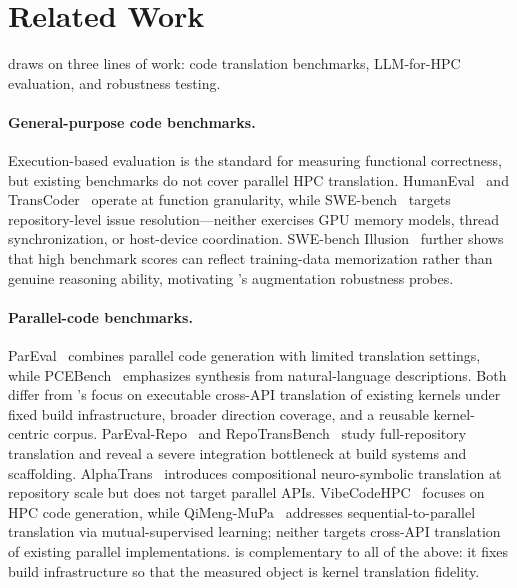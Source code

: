 \section{Related Work}
\label{sec:related-work}
\label{app:related-work} %

\parbench{} draws on three lines of work: code translation benchmarks, LLM-for-HPC evaluation, and robustness testing.

\paragraph{General-purpose code benchmarks.}
Execution-based evaluation is the standard for measuring functional correctness, but existing benchmarks do not cover parallel HPC translation. HumanEval~\cite{HumanEval2021} and TransCoder~\cite{TransCoder2020} operate at function granularity, while SWE-bench~\cite{SWEbench2024} targets repository-level issue resolution—neither exercises GPU memory models, thread synchronization, or host-device coordination. SWE-bench Illusion~\cite{SWEbenchIllusion2025} further shows that high benchmark scores can reflect training-data memorization rather than genuine reasoning ability, motivating \parbench{}'s augmentation robustness probes. 


\paragraph{Parallel-code benchmarks.}
ParEval~\cite{ParEval2024} combines parallel code generation with limited translation settings, while PCEBench~\cite{PCEBench2025} emphasizes synthesis from natural-language descriptions. Both differ from \parbench{}'s focus on executable cross-API translation of existing kernels under fixed build infrastructure, broader direction coverage, and a reusable kernel-centric corpus. ParEval-Repo~\cite{ParEvalRepo2025} and RepoTransBench~\cite{Wang2026RepoTransBench} study full-repository translation and reveal a severe integration bottleneck at build systems and scaffolding. AlphaTrans~\cite{AlphaTrans2025} introduces compositional neuro-symbolic translation at repository scale but does not target parallel APIs. VibeCodeHPC~\cite{VibeCodeHPC2026} focuses on HPC code generation, while QiMeng-MuPa~\cite{QiMengMuPa2025} addresses sequential-to-parallel translation via mutual-supervised learning; neither targets cross-API translation of existing parallel implementations. \parbench{} is complementary to all of the above: it fixes build infrastructure so that the measured object is kernel translation fidelity.

